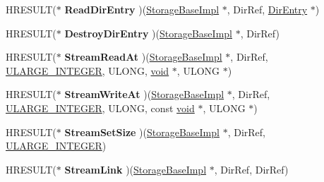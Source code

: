 \begin{DoxyCompactItemize}
\item 
\mbox{\label{struct_storage_base_impl_vtbl_a0ec21087eaab4bf497b4c7dea66d434d}} 
H\+R\+E\+S\+U\+LT($\ast$ {\bfseries Read\+Dir\+Entry} )(\hyperlink{struct_storage_base_impl}{Storage\+Base\+Impl} $\ast$, Dir\+Ref, \hyperlink{struct_dir_entry}{Dir\+Entry} $\ast$)
\item 
\mbox{\label{struct_storage_base_impl_vtbl_afb9488fb58946bfdc9d7edf4fbd8e364}} 
H\+R\+E\+S\+U\+LT($\ast$ {\bfseries Destroy\+Dir\+Entry} )(\hyperlink{struct_storage_base_impl}{Storage\+Base\+Impl} $\ast$, Dir\+Ref)
\item 
\mbox{\label{struct_storage_base_impl_vtbl_ade34d617749c77e91f3ad0682ed7b963}} 
H\+R\+E\+S\+U\+LT($\ast$ {\bfseries Stream\+Read\+At} )(\hyperlink{struct_storage_base_impl}{Storage\+Base\+Impl} $\ast$, Dir\+Ref, \hyperlink{struct___u_l_a_r_g_e___i_n_t_e_g_e_r}{U\+L\+A\+R\+G\+E\+\_\+\+I\+N\+T\+E\+G\+ER}, U\+L\+O\+NG, \hyperlink{interfacevoid}{void} $\ast$, U\+L\+O\+NG $\ast$)
\item 
\mbox{\label{struct_storage_base_impl_vtbl_a22bc54f7200c3429790d18b5105d8a57}} 
H\+R\+E\+S\+U\+LT($\ast$ {\bfseries Stream\+Write\+At} )(\hyperlink{struct_storage_base_impl}{Storage\+Base\+Impl} $\ast$, Dir\+Ref, \hyperlink{struct___u_l_a_r_g_e___i_n_t_e_g_e_r}{U\+L\+A\+R\+G\+E\+\_\+\+I\+N\+T\+E\+G\+ER}, U\+L\+O\+NG, const \hyperlink{interfacevoid}{void} $\ast$, U\+L\+O\+NG $\ast$)
\item 
\mbox{\label{struct_storage_base_impl_vtbl_abf59073fcd291102676014b2320beb2c}} 
H\+R\+E\+S\+U\+LT($\ast$ {\bfseries Stream\+Set\+Size} )(\hyperlink{struct_storage_base_impl}{Storage\+Base\+Impl} $\ast$, Dir\+Ref, \hyperlink{struct___u_l_a_r_g_e___i_n_t_e_g_e_r}{U\+L\+A\+R\+G\+E\+\_\+\+I\+N\+T\+E\+G\+ER})
\item 
\mbox{\label{struct_storage_base_impl_vtbl_a0395f065f2687ce84a5db9d4ea55ee7e}} 
H\+R\+E\+S\+U\+LT($\ast$ {\bfseries Stream\+Link} )(\hyperlink{struct_storage_base_impl}{Storage\+Base\+Impl} $\ast$, Dir\+Ref, Dir\+Ref)
\item 
\mbox{\label{struct_storage_base_impl_vtbl_a754f24add4dfb502e7433851ef16c009}} 

\end{DoxyCompactItemize}
